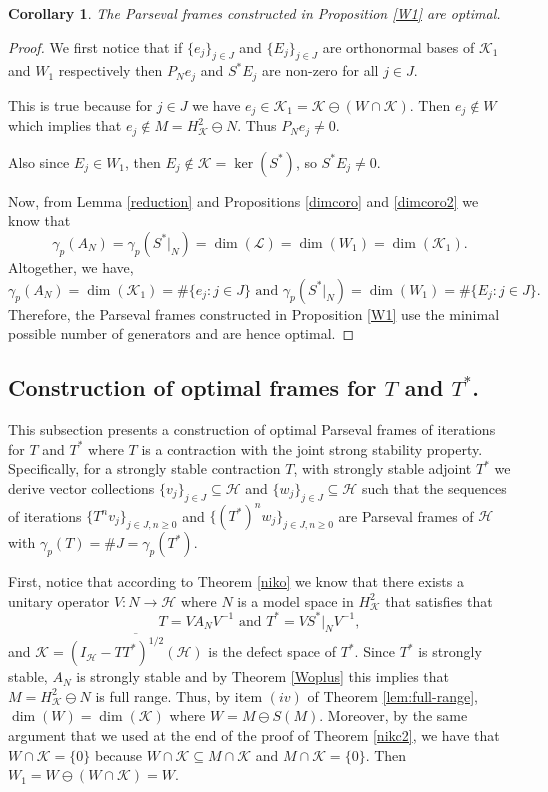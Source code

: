 \documentclass[a4paper,12pt]{amsart}
\def\HH{{\mathcal{H}}}
\def\KK{{\mathcal{K}}}
\newtheorem{corollary}[theorem]{Corollary}
\theoremstyle{definition}
\begin{document}
\begin{corollary}\label{coroOptimal}
The Parseval frames constructed in Proposition \ref{W1} are optimal.
\end{corollary}
\begin{proof}
 
We first notice that if $\{e_j\}_{j\in J}$ and $\{E_j\}_{j\in J}$ are orthonormal bases of $\KK_1$ and $W_1$ respectively then $P_Ne_j$ and $S^*E_j$ are non-zero for all $j\in J.$

This is true because for $ j\in J$ we have $e_j\in\KK_1=\KK\ominus (W\cap\KK)$. Then $e_j\notin W$ which implies that $e_j\notin M= H^2_{\KK}\ominus N$.
Thus $P_Ne_j\neq 0.$


Also since $E_j\in W_1$, then $E_j\notin\KK =\ker(S^*)$, so $S^*E_j\neq 0.$

Now, from Lemma \ref{reduction} and Propositions \ref{dimcoro} and \ref{dimcoro2} we know that 
$$\gamma_p(A_N) =\gamma_p(S^*|_N)=\dim(\mathcal{L})=\dim (W_1)=\dim(\KK_1).$$
Altogether, we have,
 $$\gamma_p(A_N)=\dim(\KK_1) =\#\{e_j: j\in J\}\text{ and }\gamma_p(S^*|_N)=\dim(W_1) =\#\{E_j: j\in J\}.$$
 Therefore, the Parseval frames constructed in Proposition \ref{W1} use the minimal possible number of generators and are hence optimal.
\end{proof}
\subsection{Construction of optimal frames for \texorpdfstring{$T$}{T} and \texorpdfstring{$T^*$}{T*}.}\label{sec:optimalframes}

This subsection presents a construction of optimal Parseval frames of iterations for $T$ and $T^*$ where $T$ is a contraction with the joint strong stability property. Specifically, for
a strongly stable contraction $T$, with strongly stable adjoint $T^*$ we derive vector collections $\{v_j\}_{j\in J}\subseteq\HH$ and 
$\{w_j\}_{j\in J}\subseteq\HH$ such that the sequences of iterations $\{T^nv_j\}_{j\in J,n\geqslant0}$ and $\{(T^*)^nw_j\}_{j\in J, n\geqslant0}$ are Parseval frames of
 $\HH$ with $\gamma_p(T)=\#J=\gamma_p(T^*).$


 
First, notice that according to Theorem \ref{niko} we know that there exists a unitary operator $V: N\rightarrow\HH$ 
where $N$ is a model space in $H^2_\KK$ that satisfies that 
\begin{equation}\label{eq: T-Testrella}
T = VA_NV^{-1}\text{ and } T^*= VS^*|_N V^{-1},
\end{equation}
and $\KK =\overline{(I_\HH-TT^*)^{1/2}(\HH)}$ is the defect space of $T^*$.
 Since $T^*$ is strongly stable, $A_N$ is strongly stable and by Theorem \ref{Woplus} this implies that $M=H^2_{\KK}\ominus N$ is full range.
Thus, by item $(iv)$ of Theorem \ref{lem:full-range}, $\dim(W)=\dim(\KK)$
where $W=M\ominus S(M)$. Moreover, by the same argument that we used at the end of the proof of Theorem \ref{nikc2}, we have that $W\cap\KK=\{0\}$ because $ W\cap\KK\subseteq M\cap\KK$ and $M\cap\KK=\{0\}$.  Then $W_1=W\ominus(W\cap\KK)=W$.
\end{document}
